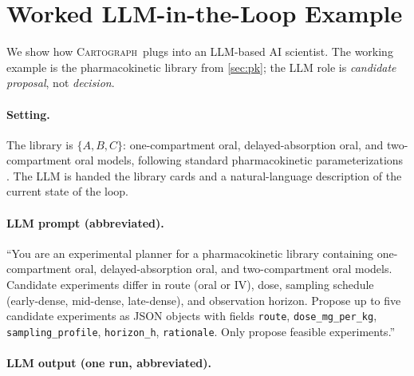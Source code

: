 \documentclass{article}
\newcommand{\method}{\textsc{Cartograph}}
\theoremstyle{plain}
\theoremstyle{definition}
\theoremstyle{remark}
\begin{document}
\section{Worked LLM-in-the-Loop Example}
\label{app:llm-agent}

We show how \method\ plugs into an LLM-based AI scientist. The working
example is the pharmacokinetic library from \cref{sec:pk}; the LLM role is
\emph{candidate proposal}, not \emph{decision}.

\paragraph{Setting.}
The library is $\{A, B, C\}$: one-compartment oral, delayed-absorption
oral, and two-compartment oral models, following standard pharmacokinetic
parameterizations \citep{gabrielsson2016pkbook}. The LLM is handed the library cards
and a natural-language description of the current state of the loop.

\paragraph{LLM prompt (abbreviated).}
``You are an experimental planner for a pharmacokinetic library containing
one-compartment oral, delayed-absorption oral, and two-compartment oral
models. Candidate experiments differ in route (oral or IV), dose, sampling
schedule (early-dense, mid-dense, late-dense), and observation horizon.
Propose up to five candidate experiments as JSON objects with fields
\texttt{route}, \texttt{dose\_mg\_per\_kg}, \texttt{sampling\_profile},
\texttt{horizon\_h}, \texttt{rationale}. Only propose feasible experiments.''

\paragraph{LLM output (one run, abbreviated).}
\begin{quote}\small{}
\end{quote}
\end{document}
